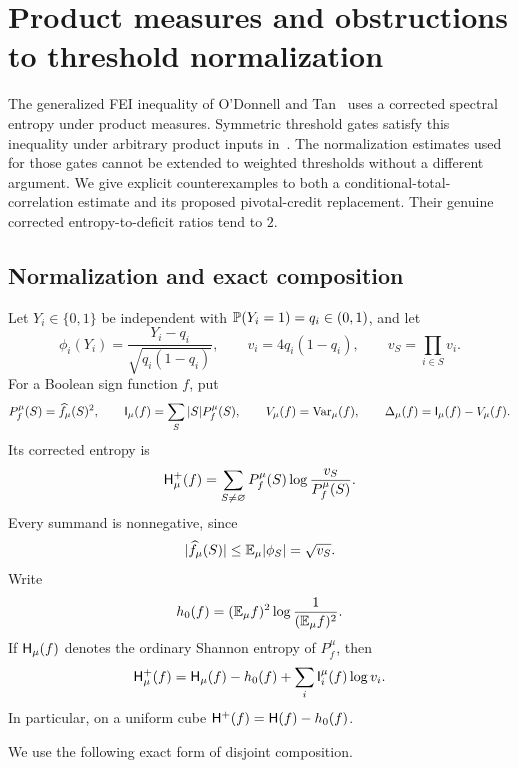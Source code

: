 \section{Product measures and obstructions to threshold normalization}
\label{biasfull:section}

The generalized FEI inequality of O'Donnell and Tan~\cite{ODT13}
uses a corrected spectral entropy under product measures. Symmetric
threshold gates satisfy this inequality under arbitrary product inputs
in~\cite{Threshold}. The normalization estimates used for those gates
cannot be extended to weighted thresholds without a different argument.
We give explicit counterexamples to both a conditional-total-correlation
estimate and its proposed pivotal-credit replacement. Their genuine
corrected entropy-to-deficit ratios tend to \(2\).

\subsection{Normalization and exact composition}

Let \(Y_i\in\{0,1\}\) be independent with
\(\P(Y_i=1)=q_i\in(0,1)\), and let
\[
 \phi_i(Y_i)=\frac{Y_i-q_i}{\sqrt{q_i(1-q_i)}},
 \qquad v_i=4q_i(1-q_i),\qquad v_S=\prod_{i\in S}v_i.
\]
For a Boolean sign function \(f\), put
\[
 P_f^\mu(S)=\wh f_\mu(S)^2,\qquad
 \I_\mu(f)=\sum_S|S|P_f^\mu(S),\qquad
 V_\mu(f)=\Var_\mu(f),
 \qquad \Delta_\mu(f)=\I_\mu(f)-V_\mu(f).
\]
Its corrected entropy is
\begin{equation}\label{biasfull:hplus}
 \HH_\mu^+(f)=\sum_{S\ne\varnothing}P_f^\mu(S)
                      \log\frac{v_S}{P_f^\mu(S)}.
\end{equation}
Every summand is nonnegative, since
\[
 |\wh f_\mu(S)|\le\E_\mu|\phi_S|=\sqrt{v_S}.
\]
Write
\[
 h_0(f)=(\E_\mu f)^2\log\frac1{(\E_\mu f)^2}.
\]
If \(\HH_\mu(f)\) denotes the ordinary Shannon entropy of
\(P_f^\mu\), then
\begin{equation}\label{biasfull:rawcorrected}
 \HH_\mu^+(f)=\HH_\mu(f)-h_0(f)
                    +\sum_i\I_i^\mu(f)\log v_i.
\end{equation}
In particular, on a uniform cube
\(\HH^+(f)=\HH(f)-h_0(f)\).

We use the following exact form of disjoint composition.


